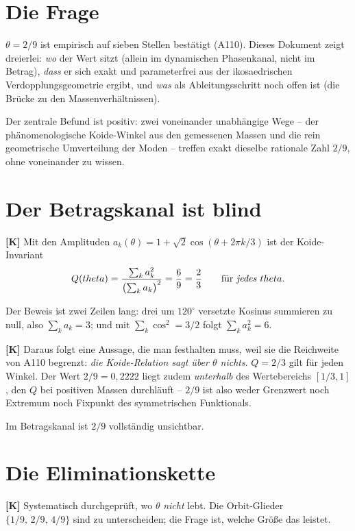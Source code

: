 \section{Die Frage}

$\theta = 2/9$ ist empirisch auf sieben Stellen bestätigt (A110). Dieses
Dokument zeigt dreierlei: \emph{wo} der Wert sitzt (allein im dynamischen
Phasenkanal, nicht im Betrag), \emph{dass} er sich exakt und parameterfrei aus
der ikosaedrischen Verdopplungsgeometrie ergibt, und \emph{was} als
Ableitungsschritt noch offen ist (die Brücke zu den Massenverhältnissen).

Der zentrale Befund ist positiv: zwei voneinander unabhängige Wege -- der
phänomenologische Koide-Winkel aus den gemessenen Massen und die rein
geometrische Umverteilung der Moden -- treffen exakt dieselbe rationale Zahl
$2/9$, ohne voneinander zu wissen.

\section{Der Betragskanal ist blind}

\textbf{[K]} Mit den Amplituden $a_k(\theta) = 1 + \sqrt2\cos(\theta+2\pi k/3)$
ist der Koide-Invariant
\[
  Q(\theta) = \frac{\sum_k a_k^2}{\bigl(\sum_k a_k\bigr)^2} = \frac{6}{9} = \frac23
  \qquad\text{für \emph{jedes} } \theta .
\]

Der Beweis ist zwei Zeilen lang: drei um $120^\circ$ versetzte Kosinus summieren
zu null, also $\sum_k a_k = 3$; und mit $\sum_k\cos^2 = 3/2$ folgt
$\sum_k a_k^2 = 6$.

\textbf{[K]} Daraus folgt eine Aussage, die man festhalten muss, weil sie die
Reichweite von A110 begrenzt: \emph{die Koide-Relation sagt über $\theta$
nichts}. $Q=2/3$ gilt für jeden Winkel. Der Wert $2/9 = 0{,}2222$ liegt
zudem \emph{unterhalb} des Wertebereichs $[1/3,1]$, den $Q$ bei positiven
Massen durchläuft -- $2/9$ ist also weder Grenzwert noch Extremum noch
Fixpunkt des symmetrischen Funktionals.

Im Betragskanal ist $2/9$ vollständig unsichtbar.

\section{Die Eliminationskette}

\textbf{[K]} Systematisch durchgeprüft, wo $\theta$ \emph{nicht} lebt. Die
Orbit-Glieder $\{1/9,\,2/9,\,4/9\}$ sind zu unterscheiden; die Frage ist,
welche Größe das leistet.

